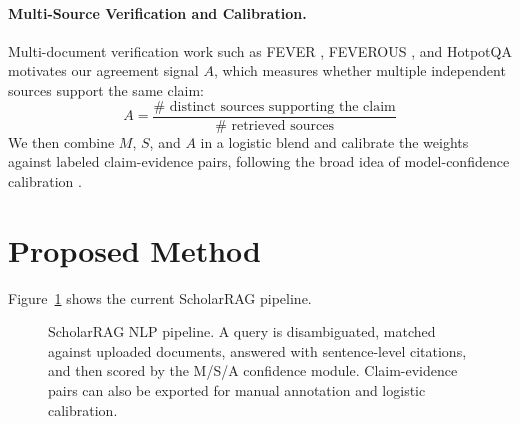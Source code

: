 \documentclass[10pt]{article}
\begin{document}
\paragraph{Multi-Source Verification and Calibration.}
Multi-document verification work such as FEVER \citep{thorne2018fever},
FEVEROUS \citep{wadden2020feverous}, and HotpotQA
\citep{yang2018hotpotqa} motivates our agreement signal $A$, which
measures whether multiple independent sources support the same claim:
\begin{equation}
A = \frac{\# \text{ distinct sources supporting the claim}}
         {\# \text{ retrieved sources}}
\end{equation}
We then combine $M$, $S$, and $A$ in a logistic blend and calibrate
the weights against labeled claim-evidence pairs, following the broad
idea of model-confidence calibration \citep{guo2017calibration}.

\section{Proposed Method}

Figure~\ref{fig:pipeline} shows the current ScholarRAG pipeline.

\begin{figure}[t]
\centering
\footnotesize
{}
\caption{ScholarRAG NLP pipeline. A query is disambiguated, matched
against uploaded documents, answered with sentence-level citations, and
then scored by the M/S/A confidence module. Claim-evidence pairs can
also be exported for manual annotation and logistic calibration.}
\label{fig:pipeline}
\end{figure}
\end{document}
